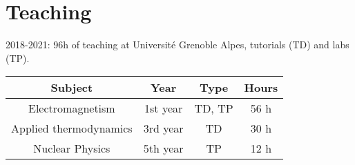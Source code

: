 \section{Teaching}\label{teaching}

2018-2021: 96h of teaching at Université Grenoble Alpes, tutorials (TD) and labs (TP).

\vspace{15pt}
\begin{table}[H]
    \centering
    \small
    {\def\arraystretch{1.}\tabcolsep=20pt
    \begin{tabular}{c c c c}
    \toprule
    \textbf{Subject} & \textbf{Year} & \textbf{Type} & \textbf{Hours} \\
    \midrule
    Electromagnetism       & 1st year  & TD, TP & 56 h \\[5pt]
    Applied thermodynamics & 3rd year  & TD     & 30 h \\[5pt]
    Nuclear Physics        & 5th year  & TP     & 12 h  \\
    \bottomrule
    \end{tabular}}
\end{table}
\normalsize
